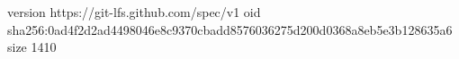 version https://git-lfs.github.com/spec/v1
oid sha256:0ad4f2d2ad4498046e8c9370cbadd8576036275d200d0368a8eb5e3b128635a6
size 1410
